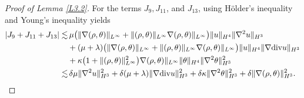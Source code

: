\documentclass[reqno,11pt]{amsart}
\theoremstyle{plain}
\numberwithin{equation}{section}
\begin{document}
\begin{proof}[Proof of Lemma \ref{L3.2}]
For the terms $J_{9}, J_{11}$, and $J_{13}$, 
using H\"{o}lder's inequality and Young's inequality yields
\begin{align}\label{G3.16}
|J_{9}+J_{11}+J_{13}|\lesssim &\, \mu \big(\|\nabla(\rho,\theta)\|_{L^\infty}  +\|(\rho,\theta)\|_{L^\infty}\nabla(\rho,\theta)\|_{L^\infty}\big) \|u\|_{H^4}\|\nabla^2 u\|_{H^3} \nonumber\\
&+(\mu+\lambda)\big(\|\nabla(\rho,\theta)\|_{L^\infty}  +\|(\rho,\theta)\|_{L^\infty}\nabla(\rho,\theta)\|_{L^\infty}\big) \|u\|_{H^4}\|\nabla {\rm div}u\|_{H^3} \nonumber\\
&+\kappa  \big(1+   \|(\rho,\theta)\|_{L^\infty}^2\big) \nabla(\rho,\theta)\|_{L^\infty} \|\theta \|_{H^4}\|\nabla^2\theta\|_{H^3}^2 \nonumber\\
\lesssim&\, \delta\mu \|\nabla^2 u\|_{H^3}^2+\delta(\mu+\lambda)\|\nabla{\rm div}u\|_{H^3}^2+\delta\kappa\|\nabla^2\theta\|_{H^3}^2+\delta\|\nabla(\rho,\theta)\|_{H^3}^2.
\end{align}  
 

\end{proof}
\end{document}
